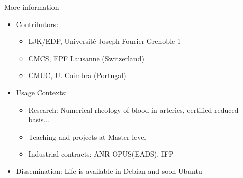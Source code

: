 \documentclass[final,utf8,,hyperref={pdfpagelabels=false}]{beamer}
\begin{document}
\begin{frame}[containsverbatim]{}
\begin{columns}[t]
      \begin{block}{More information}
        \vspace{-0.5cm}
      \begin{itemize}
      \item Contributors:
        \begin{itemize}
        \item LJK/EDP, Université Joseph Fourier Grenoble 1
        \item CMCS, EPF Lausanne (Switzerland)
        \item CMUC, U. Coimbra (Portugal)
        \end{itemize}
      \item Usage Contexts:
        \begin{itemize}
        \item Research: Numerical rheology of blood in arteries, certified
          reduced basis...
        \item Teaching and projects at Master level
        \item Industrial contracts: ANR OPUS(EADS), IFP
        \end{itemize}
      \item Dissemination: Life is available in Debian and soon Ubuntu
      \end{itemize}
    \end{block}

  \end{columns}
  \end{frame}





  
\end{document}
